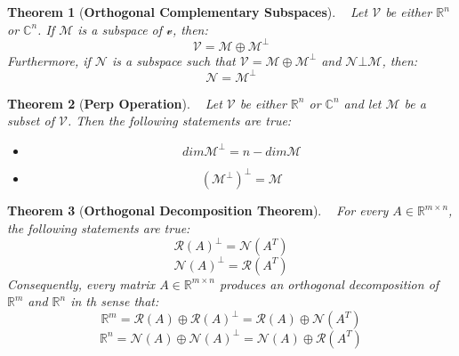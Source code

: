 \documentclass[10.5pt]{article}
\newtheorem{theo}{Theorem}
\newenvironment{definition}[2][Definition]{\begin{trivlist}
\item[\hskip \labelsep {\bfseries #1}\hskip \labelsep {\bfseries #2.}]}{\end{trivlist}}
\begin{document}
\begin{theo}[\textbf{Orthogonal Complementary Subspaces}]
~ Let $\mathcal{V}$ be either $\mathbb{R}^n$ or $\mathbb{C}^n$. If $\mathcal{M}$ is a subspace of $\mathcal{v}$, then:
$$\mathcal{V}=\mathcal{M}\oplus \mathcal{M}^{\bot}$$
Furthermore, if $\mathcal{N}$ is a subspace such that $\mathcal{V}=\mathcal{M}\oplus \mathcal{M}^{\bot}$ and $\mathcal{N}\bot \mathcal{M}$, then:
$$\mathcal{N}= \mathcal{M}^{\bot}$$
\end{theo}
\begin{theo}[\textbf{Perp Operation}]
~ Let $\mathcal{V}$ be either $\mathbb{R}^n$ or $\mathbb{C}^n$ and let $\mathcal{M}$ be a subset of $\mathcal{V}$. Then the following statements are true:
\begin{itemize}
\item $$dim\mathcal{M}^{\bot}=n-dim\mathcal{M}$$
\item $$(\mathcal{M}^{\bot})^{\bot}=\mathcal{M}$$
\end{itemize}
\end{theo}
\begin{theo}[\textbf{Orthogonal Decomposition Theorem}]
~ For every $A\in \mathbb{R}^{m\times n}$, the following statements are true:
$$\mathcal{R}(A)^{\bot}=\mathcal{N}(A^T)$$
$$\mathcal{N}(A)^{\bot}=\mathcal{R}(A^T)$$
Consequently, every matrix $A\in \mathbb{R}^{m\times n}$ produces an orthogonal decomposition of $\mathbb{R}^m$ and $\mathbb{R}^n$ in th sense that:
$$\mathbb{R}^m=\mathcal{R}(A)\oplus \mathcal{R}(A)^{\bot}=\mathcal{R}(A)\oplus \mathcal{N}(A^T)$$
$$\mathbb{R}^n=\mathcal{N}(A)\oplus \mathcal{N}(A)^{\bot}=\mathcal{N}(A)\oplus \mathcal{R}(A^T)$$
\end{theo}
\pagebreak
\end{document}
